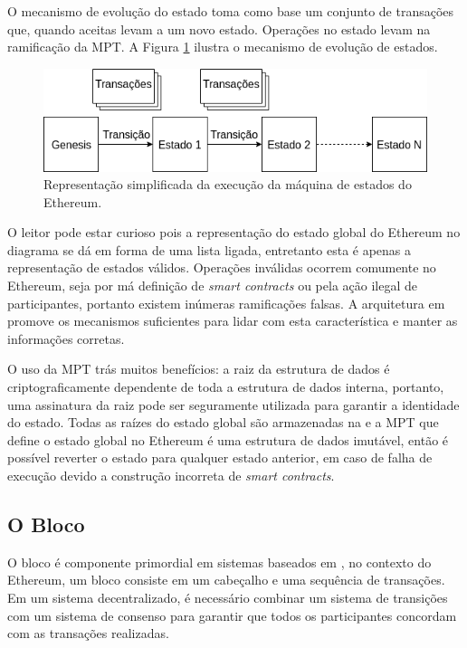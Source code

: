 \documentclass[tcc,capa]{texufpel}
\begin{document}
	O mecanismo de evolução do estado toma como base um conjunto de transações que, quando aceitas levam a um novo estado. Operações no estado levam na ramificação da MPT. A Figura \ref{fig:estado-global-ethereum} ilustra o mecanismo de evolução de estados. 
	
	\begin{figure}
        \centering
        \includegraphics[width=15cm]{imagens/estado-global-ethereum.png}
        \caption{Representação simplificada da execução da máquina de estados do Ethereum.}
        \label{fig:estado-global-ethereum}
    \end{figure}
    
    O leitor pode estar curioso pois a representação do estado global do Ethereum no diagrama se dá em forma de uma lista ligada, entretanto esta é apenas a representação de estados válidos. Operações inválidas ocorrem comumente no Ethereum, seja por má definição de \textit{smart contracts} ou pela ação ilegal de participantes, portanto existem inúmeras ramificações falsas. A arquitetura em \bchain promove os mecanismos suficientes para lidar com esta característica e manter as informações corretas.

	O uso da MPT trás muitos benefícios: a raiz da estrutura de dados é criptograficamente dependente de toda a estrutura de dados interna, portanto, uma assinatura da raiz pode ser seguramente utilizada para garantir a identidade do estado. Todas as raízes do estado global são armazenadas na \bchain e a MPT que define o estado global no Ethereum é uma estrutura de dados imutável, então é possível reverter o estado para qualquer estado anterior, em caso de falha de execução devido a construção incorreta de \textit{smart contracts}.
	
	
	\subsection{O Bloco}
	
	O bloco é componente primordial em sistemas baseados em \bchain, no contexto do Ethereum, um bloco consiste em um cabeçalho e uma sequência de transações. Em um sistema decentralizado, é necessário combinar um sistema de transições com um sistema de consenso para garantir que todos os participantes concordam com as transações realizadas.
	
\end{document}
